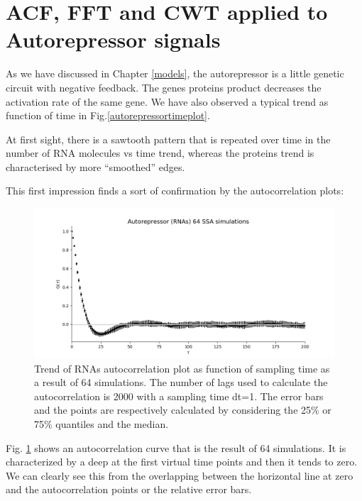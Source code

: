 \documentclass[12pt,a4paper]{report}
\begin{document}
\section{ACF, FFT and CWT applied to Autorepressor signals}
As we have discussed in Chapter \ref{models}, the autorepressor is a little genetic circuit with negative feedback. The gene\textquotesingle s proteins product decreases the activation rate of the same gene. We have also observed a typical trend as function of time in Fig.\ref{autorepressortimeplot}.

At first sight, there is a sawtooth pattern that is repeated over time in the number of RNA molecules vs time trend, whereas the proteins trend is characterised by more ``smoothed'' edges.

This first impression finds a sort of confirmation by the autocorrelation plots:

\begin{figure}[!ht]
\centering
\includegraphics[scale=0.60]{AutorepressorRNAsACFnlags2000dt1nsimulations64.PNG}
\caption{Trend of RNAs autocorrelation plot as function of sampling time as a result of 64 simulations. The number of lags used to calculate the autocorrelation is 2000 with a sampling time dt=1. The error bars  and the points are respectively calculated by considering the 25\% or 75\% quantiles and the median.}
\label{AutorepressorRNAsACFnlags2000dt1nsimulations64}
\end{figure}
\newpage
Fig. \ref{AutorepressorRNAsACFnlags2000dt1nsimulations64} shows an autocorrelation curve that is the result of 64 simulations. It is characterized by a deep at the first virtual time points and then it tends to zero. We can clearly see this from the overlapping between the horizontal line at zero and the autocorrelation points or the relative error bars.
\end{document}
